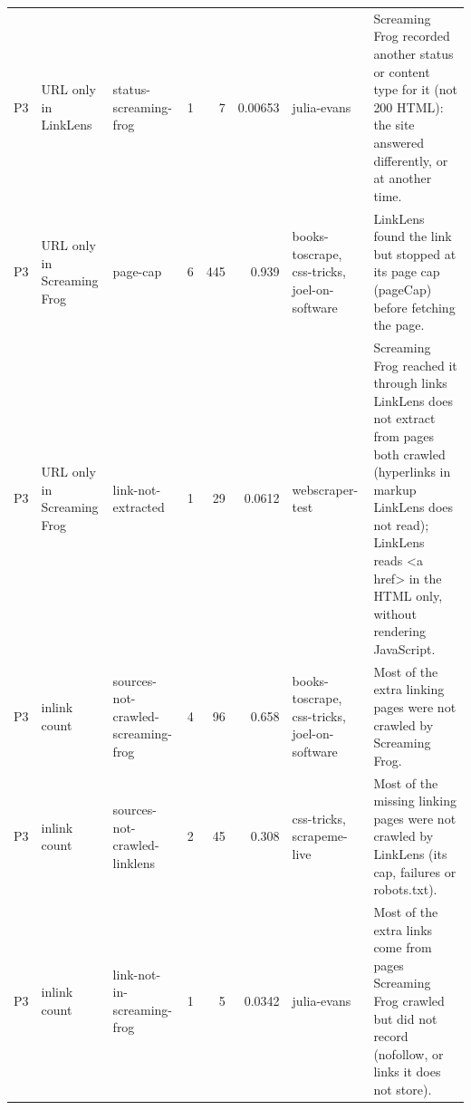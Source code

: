 \begin{table}[t]
{\begin{tabular}{lllrrrll}
P3 & URL only in LinkLens & status-screaming-frog & 1 & 7 & 0.00653 & julia-evans & Screaming Frog recorded another status or content type for it (not 200 HTML): the site answered differently, or at another time. \\
P3 & URL only in Screaming Frog & page-cap & 6 & 445 & 0.939 & books-toscrape, css-tricks, joel-on-software & LinkLens found the link but stopped at its page cap (pageCap) before fetching the page. \\
P3 & URL only in Screaming Frog & link-not-extracted & 1 & 29 & 0.0612 & webscraper-test & Screaming Frog reached it through links LinkLens does not extract from pages both crawled (hyperlinks in markup LinkLens does not read); LinkLens reads \textless{}a href\textgreater{} in the HTML only, without rendering JavaScript. \\
P3 & inlink count & sources-not-crawled-screaming-frog & 4 & 96 & 0.658 & books-toscrape, css-tricks, joel-on-software & Most of the extra linking pages were not crawled by Screaming Frog. \\
P3 & inlink count & sources-not-crawled-linklens & 2 & 45 & 0.308 & css-tricks, scrapeme-live & Most of the missing linking pages were not crawled by LinkLens (its cap, failures or robots.txt). \\
P3 & inlink count & link-not-in-screaming-frog & 1 & 5 & 0.0342 & julia-evans & Most of the extra links come from pages Screaming Frog crawled but did not record (nofollow, or links it does not store). \\
\bottomrule
\end{tabular}}
\end{table}
